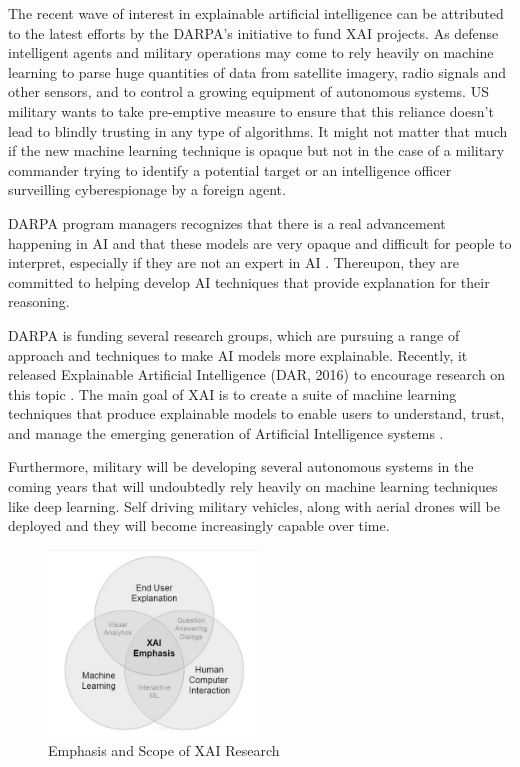 The recent wave of interest in explainable artificial intelligence can be attributed to the latest efforts by the DARPA's initiative to fund XAI projects. As defense intelligent agents and military operations may come to rely heavily on machine learning to parse huge quantities of data from satellite imagery, radio signals and other sensors, and to control a growing equipment of autonomous systems. US military wants to take pre-emptive measure to ensure that this reliance doesn’t lead to blindly trusting in any type of algorithms. It might not matter that much if the new machine learning technique is opaque but not in the case of a military commander trying to identify a potential target \cite{Knight2017} or an intelligence officer surveilling cyberespionage by a foreign agent.

DARPA program managers recognizes that there is a real advancement happening in AI and that these models are very opaque and difficult for people to interpret, especially if they are not an expert in AI \cite{Knight2017}. Thereupon, they are committed to helping develop AI techniques that provide explanation for their reasoning.

DARPA is funding several research groups, which are pursuing a range of approach and techniques to make AI models more explainable. Recently, it released Explainable Artificial Intelligence (DAR, 2016) to encourage research on this topic \cite{Gunning}. The main goal of XAI is to create a suite of machine learning techniques that produce explainable models to enable users to understand, trust, and manage the emerging generation of Artificial Intelligence systems \cite{Gunning2}.

Furthermore, military will be developing several autonomous systems in the coming years that will undoubtedly rely heavily on machine learning techniques like deep learning. Self driving military vehicles, along with aerial drones will be deployed and they will become increasingly capable over time.

\begin{figure}[htbp]
\centering
\includegraphics[width=0.5\textwidth]{images/XAI-research-1-crop.png}
\caption{Emphasis and Scope of XAI Research}
\label{fig:xai-1}
\end{figure}

